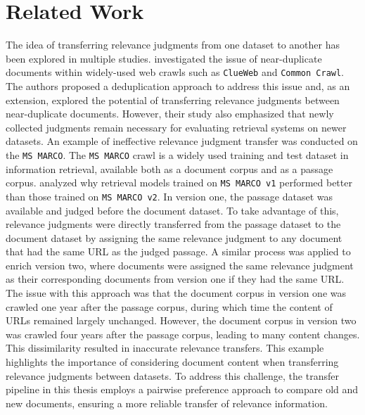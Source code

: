 \chapter{Related Work}\label{related-work}

The idea of transferring relevance judgments from one dataset to another has been explored in multiple studies. \citet{froebe:2021} investigated the issue of near-duplicate documents within widely-used web crawls such as \texttt{ClueWeb} and \texttt{Common Crawl}. The authors proposed a deduplication approach to address this issue and, as an extension, explored the potential of transferring relevance judgments between near-duplicate documents. However, their study also emphasized that newly collected judgments remain necessary for evaluating retrieval systems on newer datasets. An example of ineffective relevance judgment transfer was conducted on the  \texttt{MS MARCO}. The \texttt{MS MARCO} crawl is a widely used training and test dataset in information retrieval, available both as a document corpus and as a passage corpus. \citet{froebe:2022} analyzed  why retrieval models trained on \texttt{MS MARCO v1} performed better than those trained on \texttt{MS MARCO  v2}. In version one, the passage dataset was available and judged before the document dataset. To take advantage of this, relevance judgments were directly transferred from the passage dataset to the document dataset by assigning the same relevance judgment to any document that had the same URL as the judged passage. A similar process was applied to enrich version two, where documents were assigned the same relevance judgment as their corresponding documents from version one if they had the same URL. The issue with this approach was that the document corpus in version one was crawled one year after the passage corpus, during which time the content of URLs remained largely unchanged. However, the document corpus in version two was crawled four years after the passage corpus, leading to many content changes. This dissimilarity resulted in inaccurate relevance transfers. This example highlights the importance of considering document content when transferring relevance judgments between datasets. To address this challenge, the transfer pipeline in this thesis employs a pairwise preference approach to compare old and new documents, ensuring a more reliable transfer of relevance information.
